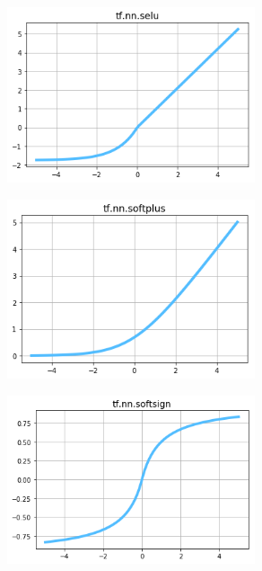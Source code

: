 \begin{figure}
\centering
\includegraphics[width=0.65\textwidth]{./sync_imgs/act/smooth/selu.png}
\label{fig:act_smooth_selu}
\end{figure}

\begin{figure}
\centering
\includegraphics[width=0.65\textwidth]{./sync_imgs/act/smooth/softplus.png}
\label{fig:act_smooth_softplus}
\end{figure}

\begin{figure}
\centering
\includegraphics[width=0.65\textwidth]{./sync_imgs/act/smooth/softsign.png}
\label{fig:act_smooth_softsign}
\end{figure}

